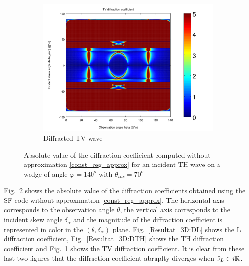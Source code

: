 \begin{figure}
\begin{subfigure}[b]{0.32\textwidth}
        \includegraphics[width=\textwidth]{images/chapter4/Resultats_3D/XpropTV_140_70_TH.png}
        \caption{Diffracted TV wave}
        \label{Resultat_3D:DTV}
    \end{subfigure} 
\caption{Absolute value of the diffraction coefficient computed without approximation \eqref{const_reg_approx} for an incident TH wave on a wedge of angle $\varphi=140^o$ with $\theta_{inc}=70^o$}
\label{Resultat_3D:D}
\end{figure}

Fig.~\ref{Resultat_3D:D} shows the absolute value of the diffraction coefficients obtained using the SF code without approximation \eqref{const_reg_approx}. The horizontal axis corresponds to the observation angle $\theta$, the vertical axis corresponds to the incident skew angle $\delta_{\alpha}$ and the magnitude of the diffraction coefficient is represented in color in the $(\theta,\delta_{\alpha})$ plane. Fig.~\ref{Resultat_3D:DL} shows the L diffraction coefficient, Fig.~\ref{Resultat_3D:DTH} shows the TH diffraction coefficient and Fig.~\ref{Resultat_3D:DTV} shows the TV diffraction coefficient. It is clear from these last two figures that the diffraction coefficient abruplty diverges when $\tilde{\nu}_L \in i\mathbb{R}$.


